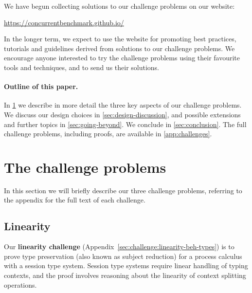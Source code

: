 \documentclass[runningheads]{llncs}
\begin{document}

We have begun collecting solutions to our challenge problems on our website:
%
\begin{center}
  \url{https://concurrentbenchmark.github.io/}
\end{center}
%
In the longer term, we expect to use the website for promoting best practices,
tutorials and guidelines derived from solutions to our challenge problems.
We encourage anyone interested to try the challenge problems using their
favourite tools and techniques, and to send us their solutions.

\paragraph{Outline of this paper.}
In \cref{sec:challenge-problems} we describe in more detail the three key
aspects of our challenge problems.  We discuss our design choices in
\cref{sec:design-discussion}, and possible extensions and further topics in
\cref{sec:going-beyond}.  We conclude in \cref{sec:conclusion}.
The full challenge problems, including proofs, are available in \cref{app:challenges}.

\section{The challenge problems}\label{sec:challenge-problems}
In this section we will briefly describe our three challenge problems, referring to the appendix for the full text of each challenge.

\subsection{Linearity}
Our \textbf{linearity challenge} (Appendix~\ref{sec:challenge:linearity-beh-types}) is to prove type preservation (also known as subject reduction) for a process calculus with a session type system.
Session type systems require linear handling of typing contexts, and the proof involves reasoning about the linearity of context splitting operations.
\end{document}
